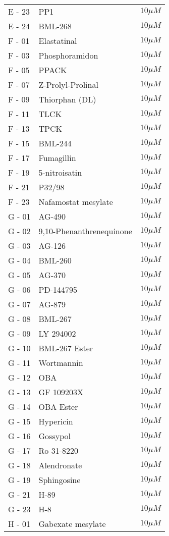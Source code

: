 \begin{center}
\begin{longtable}{|p{}|p{}|p{}|}
E - 23 & PP1	& $10\mu M$ \\
E - 24 & BML-268	& $10\mu M$ \\
F - 01 & Elastatinal	& $10\mu M$ \\
F - 03 & Phosphoramidon	& $10\mu M$ \\
F - 05 & PPACK	& $10\mu M$ \\
F - 07 & Z-Prolyl-Prolinal	& $10\mu M$ \\
F - 09 & Thiorphan (DL)	& $10\mu M$ \\
F - 11 & TLCK	& $10\mu M$ \\
F - 13 & TPCK	& $10\mu M$ \\
F - 15 & BML-244	& $10\mu M$ \\
F - 17 & Fumagillin	& $10\mu M$ \\
F - 19 & 5-nitroisatin	& $10\mu M$ \\
F - 21 & P32/98	& $10\mu M$ \\
F - 23 & Nafamostat mesylate	& $10\mu M$ \\
G - 01 & AG-490	& $10\mu M$ \\
G - 02 & 9,10-Phenanthrenequinone	& $10\mu M$ \\
G - 03 & AG-126	& $10\mu M$ \\
G - 04 & BML-260	& $10\mu M$ \\
G - 05 & AG-370	& $10\mu M$ \\
G - 06 & PD-144795	& $10\mu M$ \\
G - 07 & AG-879	& $10\mu M$ \\
G - 08 & BML-267	& $10\mu M$ \\
G - 09 & LY 294002	& $10\mu M$ \\
G - 10 & BML-267 Ester	& $10\mu M$ \\
G - 11 & Wortmannin	& $10\mu M$ \\
G - 12 & OBA	& $10\mu M$ \\
G - 13 & GF 109203X	& $10\mu M$ \\
G - 14 & OBA Ester	& $10\mu M$ \\
G - 15 & Hypericin	& $10\mu M$ \\
G - 16 & Gossypol	& $10\mu M$ \\
G - 17 & Ro 31-8220	& $10\mu M$ \\
G - 18 & Alendronate	& $10\mu M$ \\
G - 19 & Sphingosine	& $10\mu M$ \\
G - 21 & H-89	& $10\mu M$ \\
G - 23 & H-8 	& $10\mu M$ \\
H - 01 & Gabexate mesylate	& $10\mu M$ \\

\end{longtable}
\end{center}
